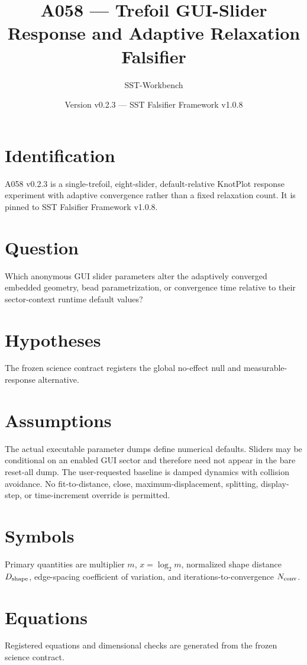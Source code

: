 \documentclass[11pt,a4paper]{article}
\begin{document}
\title{A058 --- Trefoil GUI-Slider Response and Adaptive Relaxation Falsifier}
\author{SST-Workbench}\date{Version v0.2.3 --- SST Falsifier Framework v1.0.8}\maketitle
{}
\section{Identification}
A058 v0.2.3 is a single-trefoil, eight-slider, default-relative KnotPlot response experiment with adaptive convergence rather than a fixed relaxation count. It is pinned to SST Falsifier Framework v1.0.8.
\section{Question}
Which anonymous GUI slider parameters alter the adaptively converged embedded geometry, bead parametrization, or convergence time relative to their sector-context runtime default values?
\section{Hypotheses}
The frozen science contract registers the global no-effect null and measurable-response alternative.
\section{Assumptions}
The actual executable parameter dumps define numerical defaults. Sliders may be conditional on an enabled GUI sector and therefore need not appear in the bare reset-all dump. The user-requested baseline is damped dynamics with collision avoidance. No fit-to-distance, close, maximum-displacement, splitting, display-step, or time-increment override is permitted.
\section{Symbols}
Primary quantities are multiplier $m$, $x=\log_2m$, normalized shape distance $D_{\rm shape}$, edge-spacing coefficient of variation, and iterations-to-convergence $N_{\rm conv}$.
\section{Equations}
Registered equations and dimensional checks are generated from the frozen science contract.
\end{document}
